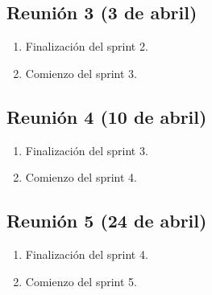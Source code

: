 \subsection{Reunión 3 (3 de abril)}
\begin{enumerate}
	\item Finalización del sprint 2.
	\item Comienzo del sprint 3.
\end{enumerate}

\subsection{Reunión 4 (10 de abril)}
\begin{enumerate}
	\item Finalización del sprint 3.
	\item Comienzo del sprint 4.
\end{enumerate}

\subsection{Reunión 5 (24 de abril)}
\begin{enumerate}
	\item Finalización del sprint 4.
	\item Comienzo del sprint 5.
\end{enumerate}
